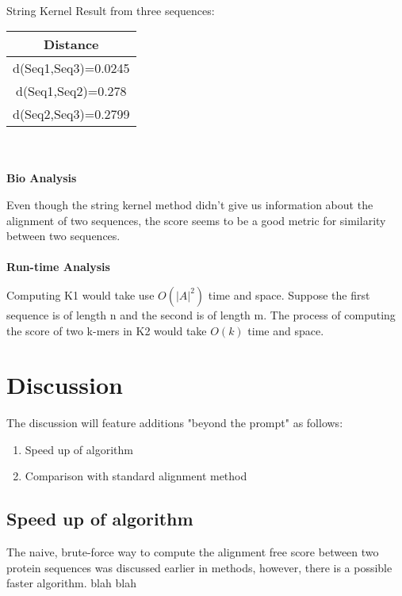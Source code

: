 \documentclass{article}
\begin{document}
\paragraph{}
String Kernel Result from three sequences:
\begin{center}
\begin{tabular}{ |c|} \hline
Distance            \\ \hline
d(Seq1,Seq3)=0.0245 \\ \hline
d(Seq1,Seq2)=0.278  \\ \hline
d(Seq2,Seq3)=0.2799 \\ \hline
\end{tabular}
\end{center}
\\\\
\textbf{Bio Analysis}

Even though the string kernel method didn’t give us information about the alignment of two sequences, the score seems to be a good metric for similarity between two sequences.
\\\\
\textbf{Run-time Analysis}

Computing K1 would take use $O(|A|^2)$ time and space. Suppose the first sequence is of length n and the second is of length m. The process of computing the score of two k-mers in K2 would take $O(k)$ time and space. 

\section{Discussion}
The discussion will feature additions "beyond the prompt" as follows:
\begin{enumerate}
    \item Speed up of algorithm
    \item Comparison with standard alignment method
\end{enumerate}
\subsection{Speed up of algorithm}
The naive, brute-force way to compute the alignment free score between two protein sequences was discussed earlier in methods, however, there is a possible faster algorithm. blah blah
\end{document}
